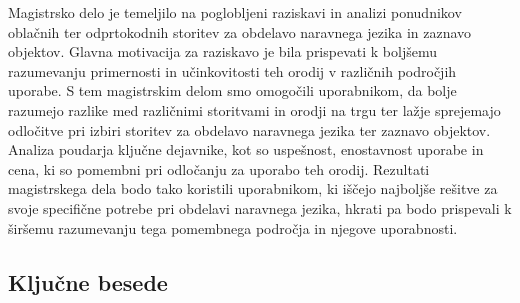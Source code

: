 Magistrsko delo je temeljilo na poglobljeni raziskavi in analizi ponudnikov oblačnih ter odprtokodnih storitev za obdelavo naravnega jezika in zaznavo objektov. Glavna motivacija za raziskavo je bila prispevati k boljšemu razumevanju primernosti in učinkovitosti teh orodij v različnih področjih uporabe. S tem magistrskim delom smo omogočili uporabnikom, da bolje razumejo razlike med različnimi storitvami in orodji na trgu ter lažje sprejemajo odločitve pri izbiri storitev za obdelavo naravnega jezika ter zaznavo objektov. Analiza poudarja ključne dejavnike, kot so uspešnost, enostavnost uporabe in cena, ki so pomembni pri odločanju za uporabo teh orodij. Rezultati magistrskega dela bodo tako koristili uporabnikom, ki iščejo najboljše rešitve za svoje specifične potrebe pri obdelavi naravnega jezika, hkrati pa bodo prispevali k širšemu razumevanju tega pomembnega področja in njegove uporabnosti.

\subsection*{Ključne besede}
\textit{\tkeywords}
\clearemptydoublepage 